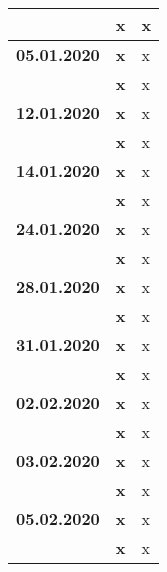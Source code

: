 {\begin{longtable}{|l|l|p{11cm}|}
			& \textbf{\hfill x} & x
		\\ \hline \textbf{05.01.2020}
			& \textbf{\hfill x} & x \\\cline{2-3}
			& \textbf{\hfill x} & x
		\\ \hline \textbf{12.01.2020}
			& \textbf{\hfill x} & x \\\cline{2-3}
			& \textbf{\hfill x} & x
		\\ \hline \textbf{14.01.2020}
			& \textbf{\hfill x} & x \\\cline{2-3}
			& \textbf{\hfill x} & x
		\\ \hline \textbf{24.01.2020}
			& \textbf{\hfill x} & x \\\cline{2-3}
			& \textbf{\hfill x} & x
		\\ \hline \textbf{28.01.2020}
			& \textbf{\hfill x} & x \\\cline{2-3}
			& \textbf{\hfill x} & x
		\\ \hline \textbf{31.01.2020}
			& \textbf{\hfill x} & x \\\cline{2-3}
			& \textbf{\hfill x} & x
		\\ \hline \textbf{02.02.2020}
			& \textbf{\hfill x} & x \\\cline{2-3}
			& \textbf{\hfill x} & x
		\\ \hline \textbf{03.02.2020}
			& \textbf{\hfill x} & x \\\cline{2-3}
			& \textbf{\hfill x} & x
		\\ \hline \textbf{05.02.2020}
			& \textbf{\hfill x} & x \\\cline{2-3}
			& \textbf{\hfill x} & x	\\
		\hline\hline
	\end{longtable}
}

\clearpage

